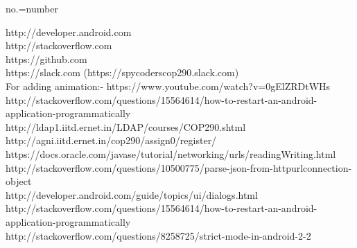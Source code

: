 \documentclass[12pt]{article}
\begin{document}

no.=number

http://developer.android.com \\
http://stackoverflow.com    \\
https://github.com          \\
https://slack.com   (https://spycoderscop290.slack.com)         \\
For adding animation:- https://www.youtube.com/watch?v=0gElZRDtWHs  \\
http://stackoverflow.com/questions/15564614/how-to-restart-an-android-application-programmatically\\
http://ldap1.iitd.ernet.in/LDAP/courses/COP290.shtml \\
http://agni.iitd.ernet.in/cop290/assign0/register/ \\
https://docs.oracle.com/javase/tutorial/networking/urls/readingWriting.html \\
http://stackoverflow.com/questions/10500775/parse-json-from-httpurlconnection-object \\
http://developer.android.com/guide/topics/ui/dialogs.html\\
http://stackoverflow.com/questions/15564614/how-to-restart-an-android-application-programmatically\\
http://stackoverflow.com/questions/8258725/strict-mode-in-android-2-2\\
\end{document}
